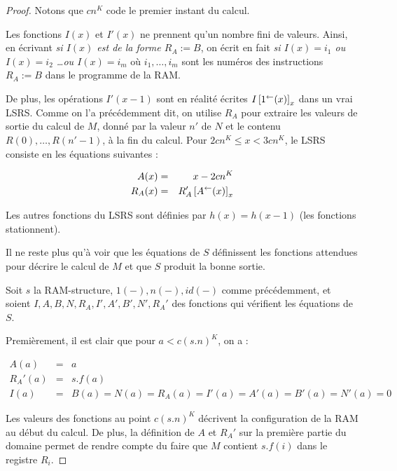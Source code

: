 \begin{proof}
{\begin{minipage}{0.9\textwidth}
				\end{minipage}
				}
			
			\espace 
			
			Notons que $cn^K$ code le premier instant du calcul. 
			
			Les fonctions $I(x)$ et $I'(x)$ ne prennent qu'un nombre fini de valeurs. Ainsi, en écrivant \emph{si $I(x)$ est de la forme $R_A := B$}, on écrit en fait \emph{si $I(x) = i_1$ ou $I(x) = i_2$ \dots ou $I(x) = i_m$} où $i_1, \dots, i_m$ sont les numéros des instructions $R_A := B$ dans le programme de la RAM.
			
			De plus, les opérations $I'(x-1)$ sont en réalité écrites $I\left[ 1^{\leftarrow}(x) \right]_{x}$ dans un vrai LSRS. Comme on l'a précédemment dit, on utilise $R_A$ pour extraire les valeurs de sortie du calcul de $M$, donné par la valeur $n'$ de $N$ et le contenu $R(0), \dots, R(n'-1)$, à la fin du calcul. Pour $2cn^K \leqslant x < 3cn^K$, le LSRS consiste en les équations suivantes :
			
			\setcounter{equation}{0}
			\begin{eqnarray}
				A(x) & = & x - 2cn^K \\
				R_A(x) & = & R_A'\left[ A^{\leftarrow}(x) \right]_{x}
			\end{eqnarray}
			
			Les autres fonctions du LSRS sont définies par $h(x) = h(x-1)$ (les fonctions stationnent).
			
			Il ne reste plus qu'à voir que les équations de $S$ définissent les fonctions attendues pour décrire le calcul de $M$ et que $S$ produit la bonne sortie.
			
			Soit $s$ la RAM-structure, $1(-), n(-), id(-)$ \footnotemark comme précédemment, et soient $I, A, B, N, R_A, I', A', B', N', R_A'$ des fonctions qui vérifient les équations de $S$.
				
			Premièrement, il est clair que pour $a < c(s.n)^K$, on a :
			
			\setcounter{equation}{0}
			\begin{eqnarray}
				A(a) & = & a \\
				R_A'(a) & = & s.f(a) \\
				I(a) & = & B(a) = N(a) = R_A(a) = I'(a) = A'(a) = B'(a) = N'(a) = 0
			\end{eqnarray}
			
			Les valeurs des fonctions au point $c(s.n)^K$ décrivent la configuration de la RAM au début du calcul. De plus, la définition de $A$ et $R_A'$ sur la première partie du domaine permet de rendre compte du faire que $M$ contient $s.f(i)$ dans le registre $R_i$.
			

\end{proof}
